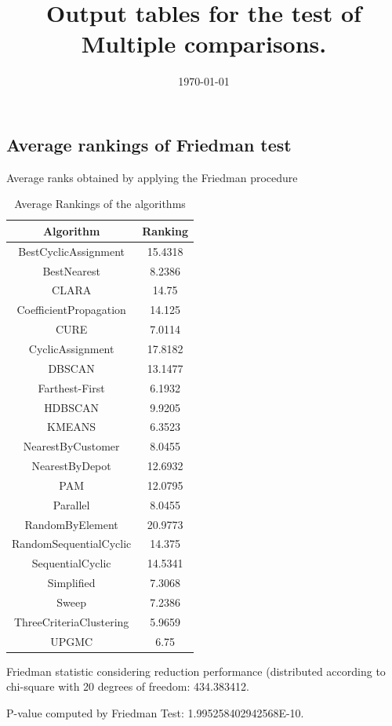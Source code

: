 \documentclass[a4paper,10pt]{article}
\title{Output tables for the test of Multiple comparisons.}
\author{}
\date{\today}
\begin{document}
\begin{landscape}
\pagestyle{empty}
\maketitle
\thispagestyle{empty}
\section{Average rankings of Friedman test}



Average ranks obtained by applying the Friedman procedure

\begin{table}[!htp]
\centering
\begin{tabular}{|c|c|}\hline
Algorithm&Ranking\\\hline
BestCyclicAssignment & 15.4318\\
BestNearest & 8.2386\\
CLARA & 14.75\\
CoefficientPropagation & 14.125\\
CURE & 7.0114\\
CyclicAssignment & 17.8182\\
DBSCAN & 13.1477\\
Farthest-First & 6.1932\\
HDBSCAN & 9.9205\\
KMEANS & 6.3523\\
NearestByCustomer & 8.0455\\
NearestByDepot & 12.6932\\
PAM & 12.0795\\
Parallel & 8.0455\\
RandomByElement & 20.9773\\
RandomSequentialCyclic & 14.375\\
SequentialCyclic & 14.5341\\
Simplified & 7.3068\\
Sweep & 7.2386\\
ThreeCriteriaClustering & 5.9659\\
UPGMC & 6.75\\
\hline
\end{tabular}
\caption{Average Rankings of the algorithms}
\end{table}

Friedman statistic considering reduction performance (distributed according to chi-square with 20 degrees of freedom: 434.383412.

P-value computed by Friedman Test: 1.995258402942568E-10.\newline


\end{landscape}
\end{document}
